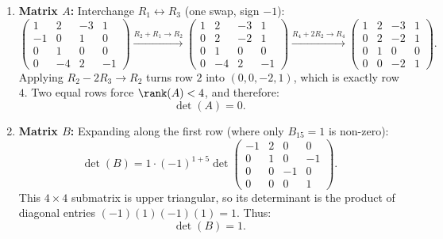 \begin{exercisesolution*}
\label{sol:determinants_via_gaussian_elimination}
\begin{enumerate}[label=\textbf{(\alph*)}]
    \item \textbf{Matrix $A$:}
    Interchange $R_1 \leftrightarrow R_3$ (one swap, sign $-1$):
    \[
    \begin{pmatrix}
      1 & 2 & -3 & 1 \\
      -1 & 0 & 1 & 0 \\
      0 & 1 & 0 & 0 \\
      0 & -4 & 2 & -1
    \end{pmatrix}
    \xrightarrow{R_2 + R_1 \to R_2}
    \begin{pmatrix}
      1 & 2 & -3 & 1 \\
      0 & 2 & -2 & 1 \\
      0 & 1 & 0 & 0 \\
      0 & -4 & 2 & -1
    \end{pmatrix}
    \xrightarrow{R_4 + 2R_2 \to R_4}
    \begin{pmatrix}
      1 & 2 & -3 & 1 \\
      0 & 2 & -2 & 1 \\
      0 & 1 & 0 & 0 \\
      0 & 0 & -2 & 1
    \end{pmatrix}.
    \]
    Applying $R_2 - 2R_3 \to R_2$ turns row $2$ into $(0, 0, -2, 1)$, which is exactly row $4$. Two equal rows force $\rank(A) < 4$, and therefore:
    \[
    \det(A) = 0.
    \]

    \item \textbf{Matrix $B$:}
    Expanding along the first row (where only $B_{15} = 1$ is non-zero):
    \[
    \det(B) = 1 \cdot (-1)^{1+5} \det \begin{pmatrix}
      -1 & 2 & 0 & 0 \\
      0 & 1 & 0 & -1 \\
      0 & 0 & -1 & 0 \\
      0 & 0 & 0 & 1
    \end{pmatrix}.
    \]
    This $4 \times 4$ submatrix is upper triangular, so its determinant is the product of diagonal entries $(-1)(1)(-1)(1) = 1$.
    Thus:
    \[
    \det(B) = 1.
    \]


\end{enumerate}
\end{exercisesolution*}
